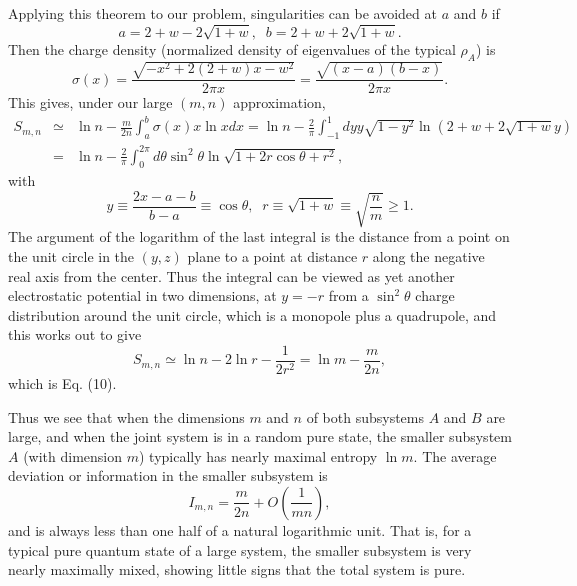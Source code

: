 Applying this theorem to our problem, singularities can be avoided at
$a$ and
$b$ if
	\begin{equation}
        a=2+w-2\sqrt{1+w},\;\;b=2+w+2\sqrt{1+w}.
	\end{equation}
Then the charge density (normalized density of eigenvalues of the
typical
$\rho_A$) is
	\begin{equation}
        \sigma(x)=\frac{\sqrt{-x^2+2(2+w)x-w^2}}{2\pi x}
	=\frac{\sqrt{(x-a)(b-x)}}{2\pi x}.
	\end{equation}
This gives, under our large $(m, n)$ approximation,
	\begin{eqnarray}
	S_{m,n} &\simeq &\ln n - \frac{m}{2n}\int_a^b\sigma(x)x\ln x
dx
	=\ln n - \frac{2}{\pi}\int_{-1}^{1}dy
y\sqrt{1-y^2}\ln(2+w+2\sqrt{1+w}y)
	\nonumber \\&=&\ln n - \frac{2}{\pi}
	\int_{0}^{2\pi}d\theta
\sin^2\theta\ln\sqrt{1+2r\cos\theta+r^2},
	\end{eqnarray}
with
	\begin{equation}
        y\equiv\frac{2x-a-b}{b-a}\equiv\cos\theta,\;\;
	r\equiv\sqrt{1+w}\equiv\sqrt{\frac{n}{m}}\geq 1.
	\end{equation}
The argument of the logarithm of the last integral is the distance
from a point
on the unit circle in the $(y,z)$ plane to a point at distance $r$
along the
negative real axis from the center.  Thus the integral can be viewed
as yet
another electrostatic potential in two dimensions, at $y=-r$ from a
$\sin^2\theta$ charge distribution around the unit circle, which is a
monopole
plus a quadrupole, and this works out to give
	\begin{equation}
	S_{m,n} \simeq \ln n-2\ln r - \frac{1}{2r^2} = \ln m -
\frac{m}{2n},
	\end{equation}
which is Eq. (10).

Thus we see that when the dimensions $m$ and $n$ of both subsystems
$A$ and $B$
are large, and when the joint system is in a random pure state, the
smaller
subsystem $A$ (with dimension $m$) typically has nearly maximal
entropy $\ln
m$.  The average deviation or information in the smaller subsystem is
	\begin{equation}
	I_{m,n} = \frac{m}{2n} + O(\frac{1}{mn}),
	\end{equation}
and is always less than one half of a natural logarithmic unit.  That
is, for a typical pure quantum state of a large system, the smaller
subsystem
is very nearly maximally mixed, showing little signs that the total
system is
pure.

